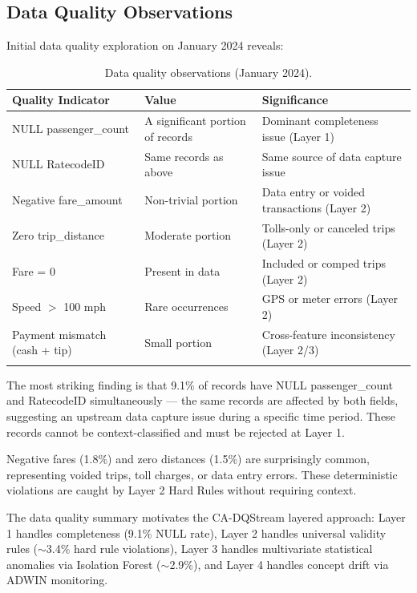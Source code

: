 \subsection{Data Quality Observations}

Initial data quality exploration on January 2024 reveals:

\begin{longtable}{|m{4cm}|m{3cm}|m{5.5cm}|}
\hline
\textbf{Quality Indicator} & \textbf{Value} & \textbf{Significance} \\ \hline
NULL passenger\_count & A significant portion of records & Dominant completeness issue (Layer 1) \\ \hline
NULL RatecodeID & Same records as above & Same source of data capture issue \\ \hline
Negative fare\_amount & Non-trivial portion & Data entry or voided transactions (Layer 2) \\ \hline
Zero trip\_distance & Moderate portion & Tolls-only or canceled trips (Layer 2) \\ \hline
Fare = 0 & Present in data & Included or comped trips (Layer 2) \\ \hline
Speed $>$ 100 mph & Rare occurrences & GPS or meter errors (Layer 2) \\ \hline
Payment mismatch (cash + tip) & Small portion & Cross-feature inconsistency (Layer 2/3) \\ \hline
\caption{Data quality observations (January 2024).}
\label{tab:dq_observations}
\end{longtable}

The most striking finding is that 9.1\% of records have NULL passenger\_count and RatecodeID simultaneously --- the same records are affected by both fields, suggesting an upstream data capture issue during a specific time period. These records cannot be context-classified and must be rejected at Layer 1.

Negative fares (1.8\%) and zero distances (1.5\%) are surprisingly common, representing voided trips, toll charges, or data entry errors. These deterministic violations are caught by Layer 2 Hard Rules without requiring context.

The data quality summary motivates the CA-DQStream layered approach: Layer 1 handles completeness (9.1\% NULL rate), Layer 2 handles universal validity rules ($\sim$3.4\% hard rule violations), Layer 3 handles multivariate statistical anomalies via Isolation Forest ($\sim$2.9\%), and Layer 4 handles concept drift via ADWIN monitoring.

